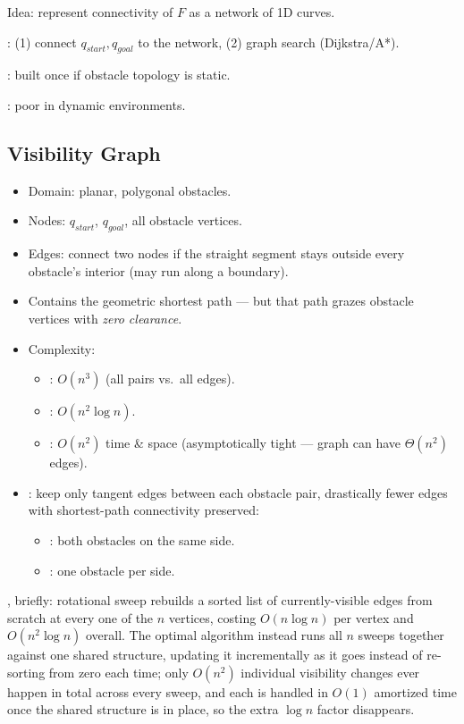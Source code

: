 Idea: represent connectivity of $F$ as a network of 1D curves.

: (1) connect $q_{start},q_{goal}$ to the network, (2) graph search (Dijkstra/A*).

: built once if obstacle topology is static.

: poor in dynamic environments.

\subsection{Visibility Graph}
\begin{itemize}
\item Domain: planar, polygonal obstacles.
\item Nodes: $q_{start}$, $q_{goal}$, all obstacle vertices.
\item Edges: connect two nodes if the straight segment stays outside every obstacle's interior (may run along a boundary).
\item Contains the geometric shortest path — but that path grazes obstacle vertices with \emph{zero clearance}.
\item Complexity:
  \begin{itemize}
  \item {}: $O(n^3)$ (all pairs vs.\ all edges).
  \item {}: $O(n^2\log n)$.
  \item {}: $O(n^2)$ time \& space (asymptotically tight --- graph can have $\Theta(n^2)$ edges).
  \end{itemize}
\item {}: keep only tangent edges between each obstacle pair, drastically fewer edges with shortest-path connectivity preserved:
  \begin{itemize}
  \item {}: both obstacles on the same side.
  \item {}: one obstacle per side.
  \end{itemize}
\end{itemize}


\begin{notebox}
, briefly: rotational sweep rebuilds a sorted list of currently-visible edges from scratch at every one of the $n$ vertices, costing $O(n\log n)$ per vertex and $O(n^2\log n)$ overall. The optimal algorithm instead runs all $n$ sweeps together against one shared structure, updating it incrementally as it goes instead of re-sorting from zero each time; only $O(n^2)$ individual visibility changes ever happen in total across every sweep, and each is handled in $O(1)$ amortized time once the shared structure is in place, so the extra $\log n$ factor disappears.
\end{notebox}

